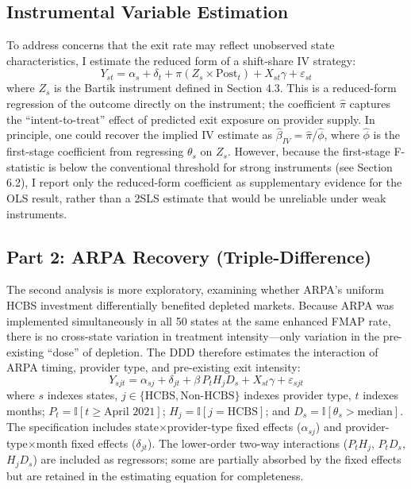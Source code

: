 \documentclass[12pt]{article}
\newcommand{\ind}{\mathbb{I}}
\begin{document}
\subsection{Instrumental Variable Estimation}

To address concerns that the exit rate may reflect unobserved state characteristics, I estimate the reduced form of a shift-share IV strategy:
\begin{equation}
Y_{st} = \alpha_s + \delta_t + \pi \left( Z_s \times \text{Post}_{t} \right) + X_{st} \gamma + \varepsilon_{st}
\end{equation}
where $Z_s$ is the Bartik instrument defined in Section 4.3. This is a reduced-form regression of the outcome directly on the instrument; the coefficient $\hat{\pi}$ captures the ``intent-to-treat'' effect of predicted exit exposure on provider supply. In principle, one could recover the implied IV estimate as $\hat{\beta}_{IV} = \hat{\pi} / \hat{\phi}$, where $\hat{\phi}$ is the first-stage coefficient from regressing $\theta_s$ on $Z_s$. However, because the first-stage F-statistic is below the conventional threshold for strong instruments (see Section 6.2), I report only the reduced-form coefficient as supplementary evidence for the OLS result, rather than a 2SLS estimate that would be unreliable under weak instruments.

\subsection{Part 2: ARPA Recovery (Triple-Difference)}

The second analysis is more exploratory, examining whether ARPA's uniform HCBS investment differentially benefited depleted markets. Because ARPA was implemented simultaneously in all 50 states at the same enhanced FMAP rate, there is no cross-state variation in treatment intensity---only variation in the pre-existing ``dose'' of depletion. The DDD therefore estimates the interaction of ARPA timing, provider type, and pre-existing exit intensity:
\begin{equation}
Y_{sjt} = \alpha_{sj} + \delta_{jt} + \beta \, P_{t} H_{j} D_s + X_{st} \gamma + \varepsilon_{sjt}
\label{eq:ddd}
\end{equation}
where $s$ indexes states, $j \in \{\text{HCBS}, \text{Non-HCBS}\}$ indexes provider type, $t$ indexes months; $P_t = \ind[t \geq \text{April 2021}]$; $H_j = \ind[j = \text{HCBS}]$; and $D_s = \ind[\theta_s > \text{median}]$. The specification includes state$\times$provider-type fixed effects ($\alpha_{sj}$) and provider-type$\times$month fixed effects ($\delta_{jt}$). The lower-order two-way interactions ($P_t H_j$, $P_t D_s$, $H_j D_s$) are included as regressors; some are partially absorbed by the fixed effects but are retained in the estimating equation for completeness.
\end{document}
